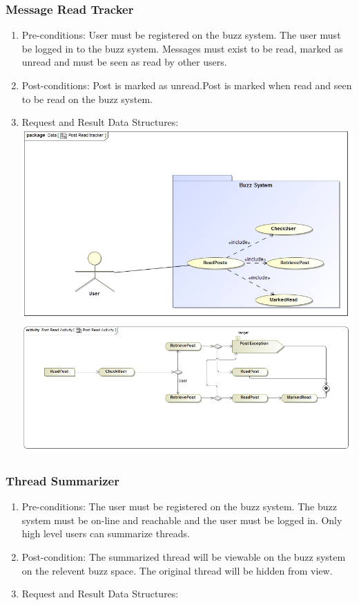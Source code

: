 \documentclass[12pt, oneside]{article}
\begin{document}
\subsubsection{Message Read Tracker}
\begin{enumerate}
 \item Pre-conditions:  User must be registered on the buzz system. The user must be logged in to the buzz system. Messages must exist to be read, marked as unread and must be seen as read by other users.
 \\
 \item Post-conditions: Post is marked as unread.Post is marked when read and seen to be read on the buzz system.
   \\
 \item Request and Result Data Structures:\\
   \includegraphics[scale=0.4]{PostReadTracker}\\
 \includegraphics[scale=0.4]{PostReadActivity} 
\end{enumerate}
\subsubsection{Thread Summarizer}
\begin{enumerate}
 \item Pre-conditions:  The user must be registered on the buzz system. The buzz system must be on-line and reachable and the user must be logged in. Only high level users can summarize threads.
 \item Post-condition:  The summarized thread will be viewable on the buzz system on the relevent buzz space. The original thread will be hidden from view.
 \\
\item Request and Result Data Structures:\\
\end{enumerate}
\end{document}
